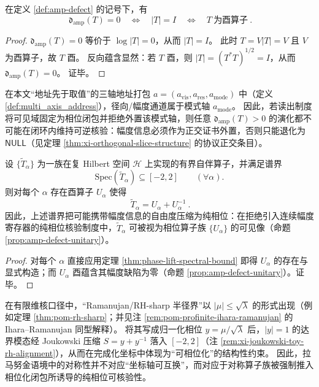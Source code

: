 \begin{proposition}\label{prop:amp-defect-unitary}
在定义 \ref{def:amp-defect} 的记号下，有
\[
\boxed{\ \mathfrak{d}_{\mathrm{amp}}(T)=0\quad\Longleftrightarrow\quad |T|=I\quad\Longleftrightarrow\quad T\ \text{为酉算子}\ }.
\]
\end{proposition}
\begin{proof}
\(\mathfrak{d}_{\mathrm{amp}}(T)=0\) 等价于 \(\log|T|=0\)，从而 \(|T|=I\)。
此时 \(T=V|T|=V\) 且 \(V\) 为酉算子，故 \(T\) 酉。
反向蕴含显然：若 \(T\) 酉，则 \(|T|=(T^\ast T)^{1/2}=I\)，从而 \(\mathfrak{d}_{\mathrm{amp}}(T)=0\)。
证毕。
\end{proof}

\begin{remark}[与三轴地址语义的对齐]\label{rem:amp-defect-address-axis}
在本文“地址先于取值”的三轴地址打包 \(a=(a_{\mathrm{vis}},a_{\mathrm{res}},a_{\mathrm{mode}})\) 中（定义 \ref{def:multi_axis_address}），径向/幅度通道属于模式轴 \(a_{\mathrm{mode}}\)。
因此，若读出制度将可见域固定为相位闭包并拒绝外置该模式轴，则任意 \(\mathfrak{d}_{\mathrm{amp}}(T)>0\) 的演化都不可能在闭环内维持可逆核验：幅度信息必须作为正交证书外置，否则只能退化为 \(\mathsf{NULL}\)（见定理 \ref{thm:xi-orthogonal-slice-structure} 的协议正交条目）。
\end{remark}

\begin{theorem}\label{thm:ramanujan-phase-lift-principle}
设 \(\{\widetilde T_\alpha\}\) 为一族在复 Hilbert 空间 \(\mathcal H\) 上实现的有界自伴算子，并满足谱界
\[
\mathrm{Spec}(\widetilde T_\alpha)\subseteq[-2,2]\qquad(\forall \alpha).
\]
则对每个 \(\alpha\) 存在酉算子 \(U_\alpha\) 使得
\[
\boxed{\ \widetilde T_\alpha=U_\alpha+U_\alpha^{-1}\ }.
\]
因此，上述谱界把可能携带幅度信息的自由度压缩为纯相位：在拒绝引入连续幅度寄存器的纯相位核验制度中，\(\widetilde T_\alpha\) 可被视为相位算子族 \(\{U_\alpha\}\) 的可见像（命题 \ref{prop:amp-defect-unitary}）。
\end{theorem}
\begin{proof}
对每个 \(\alpha\) 直接应用定理 \ref{thm:phase-lift-spectral-bound} 即得 \(U_\alpha\) 的存在与显式构造；而 \(U_\alpha\) 酉蕴含其幅度缺陷为零（命题 \ref{prop:amp-defect-unitary}）。证毕。
\end{proof}

\begin{remark}\label{rem:ramanujan-phase-lift-kernel}
在有限维核口径中，“Ramanujan/RH-sharp 半径界”以 \(|\mu|\le\sqrt{\lambda}\) 的形式出现（例如定理 \ref{thm:pom-rh-sharp}；并见注 \ref{rem:pom-profinite-ihara-ramanujan} 的 Ihara--Ramanujan 同型解释）。
将其写成归一化相位 \(y=\mu/\sqrt{\lambda}\) 后，\(|y|=1\) 的达界模态经 Joukowski 压缩 \(S=y+y^{-1}\) 落入 \([-2,2]\)（注 \ref{rem:xi-joukowski-toy-rh-alignment}），从而在完成化坐标中体现为“可相位化”的结构性约束。
因此，拉马努金语境中的对称性并不对应“坐标轴可互换”，而对应于对称算子族被强制推入相位化闭包所诱导的纯相位可核验性。
\end{remark}

